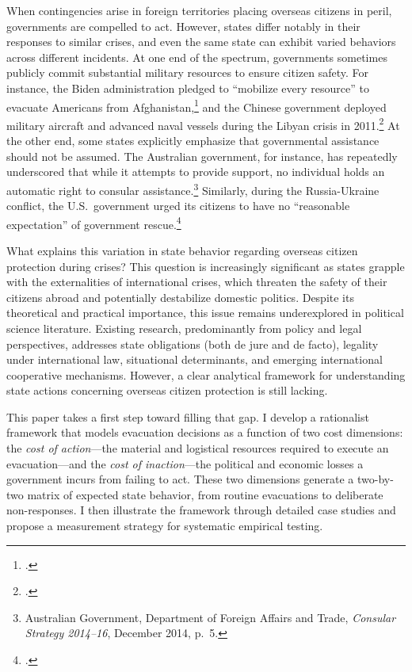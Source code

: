 \documentclass[12pt]{article}
\begin{document}
When contingencies arise in foreign territories placing overseas citizens in peril, governments are compelled to act. However, states differ notably in their responses to similar crises, and even the same state can exhibit varied behaviors across different incidents. At one end of the spectrum, governments sometimes publicly commit substantial military resources to ensure citizen safety. For instance, the Biden administration pledged to ``mobilize every resource'' to evacuate Americans from Afghanistan,\footnote{\citet{Shalal2021}.} and the Chinese government deployed military aircraft and advanced naval vessels during the Libyan crisis in 2011.\footnote{\citet{Reuters2011}.} At the other end, some states explicitly emphasize that governmental assistance should not be assumed. The Australian government, for instance, has repeatedly underscored that while it attempts to provide support, no individual holds an automatic right to consular assistance.\footnote{Australian Government, Department of Foreign Affairs and Trade, \emph{Consular Strategy 2014--16}, December 2014, p.~5.} Similarly, during the Russia-Ukraine conflict, the U.S.\ government urged its citizens to have no ``reasonable expectation'' of government rescue.\footnote{\citet{Ward2022}.}

What explains this variation in state behavior regarding overseas citizen protection during crises? This question is increasingly significant as states grapple with the externalities of international crises, which threaten the safety of their citizens abroad and potentially destabilize domestic politics. Despite its theoretical and practical importance, this issue remains underexplored in political science literature. Existing research, predominantly from policy and legal perspectives, addresses state obligations (both de jure and de facto), legality under international law, situational determinants, and emerging international cooperative mechanisms. However, a clear analytical framework for understanding state actions concerning overseas citizen protection is still lacking.

This paper takes a first step toward filling that gap. I develop a rationalist framework that models evacuation decisions as a function of two cost dimensions: the \emph{cost of action}---the material and logistical resources required to execute an evacuation---and the \emph{cost of inaction}---the political and economic losses a government incurs from failing to act. These two dimensions generate a two-by-two matrix of expected state behavior, from routine evacuations to deliberate non-responses. I then illustrate the framework through detailed case studies and propose a measurement strategy for systematic empirical testing.
\end{document}
